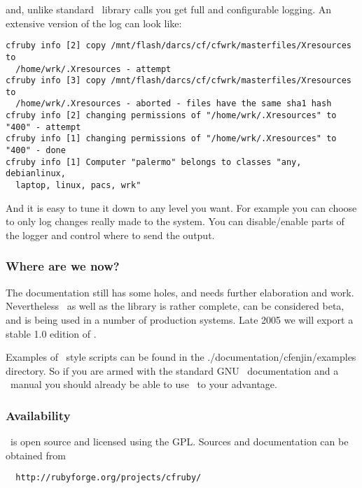 and, unlike standard \ruby\ library calls you get full and
configurable logging. An extensive version of the log can look like:

\scriptsize
\begin{verbatim}
cfruby info [2] copy /mnt/flash/darcs/cf/cfwrk/masterfiles/Xresources to 
  /home/wrk/.Xresources - attempt
cfruby info [3] copy /mnt/flash/darcs/cf/cfwrk/masterfiles/Xresources to 
  /home/wrk/.Xresources - aborted - files have the same sha1 hash
cfruby info [2] changing permissions of "/home/wrk/.Xresources" to "400" - attempt
cfruby info [1] changing permissions of "/home/wrk/.Xresources" to "400" - done
cfruby info [1] Computer "palermo" belongs to classes "any, debianlinux, 
  laptop, linux, pacs, wrk"
\end{verbatim}
\normalsize

And it is easy to tune it down to any level you want. For example you
can choose to only log changes really made to the system. You can
disable/enable parts of the logger and control where to send the
output.

\subsubsection{Where are we now?}

The documentation still has some holes, and needs further elaboration
and work. Nevertheless \cfruby\ as well as the library is rather
complete, can be considered beta, and is being used in a number of
production systems. Late 2005 we will export a stable 1.0 edition of
\cfruby. 

Examples of \cfengine\ style scripts can be found in the
./documentation/cfenjin/examples directory. So if you are armed with
the standard GNU \cfengine\ documentation and a \ruby\ manual you
should already be able to use \cfruby\ to your advantage.

\subsubsection{Availability}

\cfruby\ is open source and licensed using the GPL. Sources and
documentation can be obtained from

\begin{verbatim}
  http://rubyforge.org/projects/cfruby/
\end{verbatim}







